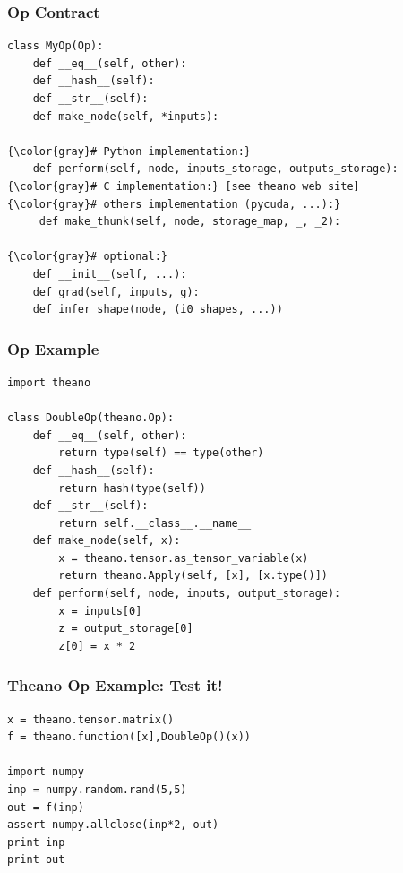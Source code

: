 \documentclass[a4paper,9pt]{beamer}
\begin{document}
\begin{frame}[fragile]
\frametitle{Op Contract}
\begin{Verbatim}[commandchars=\\\{\}]
class MyOp(Op):
    def __eq__(self, other):
    def __hash__(self):
    def __str__(self):
    def make_node(self, *inputs):

{\color{gray}# Python implementation:}
    def perform(self, node, inputs_storage, outputs_storage):
{\color{gray}# C implementation:} [see theano web site]
{\color{gray}# others implementation (pycuda, ...):}
     def make_thunk(self, node, storage_map, _, _2):

{\color{gray}# optional:}
    def __init__(self, ...):
    def grad(self, inputs, g):
    def infer_shape(node, (i0_shapes, ...))
\end{Verbatim}
\end{frame}

\begin{frame}[fragile]
\frametitle{Op Example}
\begin{Verbatim}
import theano

class DoubleOp(theano.Op):
    def __eq__(self, other):
        return type(self) == type(other)
    def __hash__(self):
        return hash(type(self))
    def __str__(self):
        return self.__class__.__name__
    def make_node(self, x):
        x = theano.tensor.as_tensor_variable(x)
        return theano.Apply(self, [x], [x.type()])
    def perform(self, node, inputs, output_storage):
        x = inputs[0]
        z = output_storage[0]
        z[0] = x * 2

\end{Verbatim}
\end{frame}

\begin{frame}[fragile]
\frametitle{Theano Op Example: Test it!}
\begin{Verbatim}
x = theano.tensor.matrix()
f = theano.function([x],DoubleOp()(x))

import numpy
inp = numpy.random.rand(5,5)
out = f(inp)
assert numpy.allclose(inp*2, out)
print inp
print out
\end{Verbatim}
\end{frame}
\end{document}
